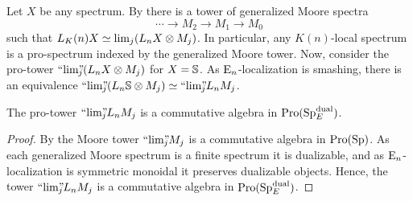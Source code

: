 Let $X$ be any spectrum. By \cite[7.10]{hovey-strickland_99} there is a tower of generalized Moore spectra 
\[\cdots \to M_2 \to M_1 \to M_0\]
such that $L_\Kn X \simeq \lim_j (L_n X \otimes M_j)$. In particular, any $K(n)$-local spectrum is a pro-spectrum indexed by the generalized Moore tower. Now, consider the pro-tower $\prolim (L_n X \otimes M_j)$ for $X=\S$. As $\En$-localization is smashing, there is an equivalence $\prolim (L_n \S \otimes M_j)\simeq \prolim L_n M_j$. 

\begin{lemma}
    \label{ch2:lm:Moore-tower-in-local-dualizable}
    The pro-tower $\prolim L_n M_j$ is a commutative algebra in $\Pro(\SpE\dual)$. 
\end{lemma}
\begin{proof}
    By \cite[6.3]{davis-lawson_2014} the Moore tower $\prolim M_j$ is a commutative algebra in $\Pro(\Sp)$. As each generalized Moore spectrum is a finite spectrum it is dualizable, and as $\En$-localization is symmetric monoidal it preserves dualizable objects. Hence, the tower $\prolim L_n M_j$ is a commutative algebra in $\Pro(\SpE\dual)$. 
\end{proof}

